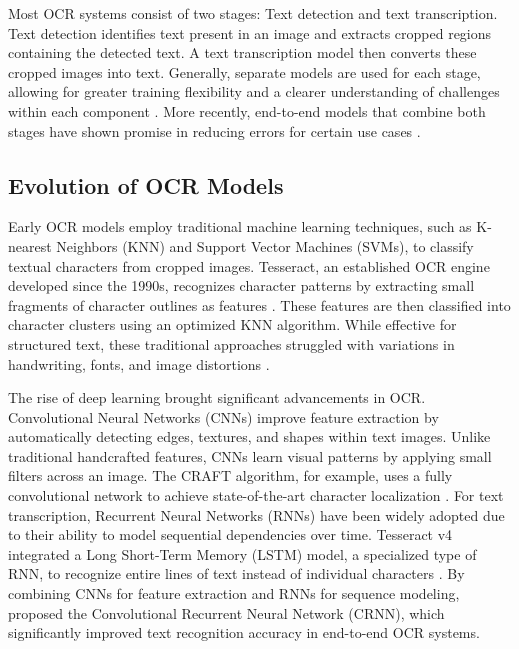 \documentclass[12pt,oneside]{memoir}
\begin{document}
Most OCR systems consist of two stages: Text detection and text transcription.
Text detection identifies text present in an image and extracts cropped regions containing the detected text. 
A text transcription model then converts these cropped images into text.
Generally, separate models are used for each stage, allowing for greater training flexibility and a clearer understanding of challenges within each component \parencite{subramani-etal-2023}. 
More recently, end-to-end models that combine both stages have shown promise in reducing errors for certain use cases \parencite{feng-etal-2019}.

\subsection{Evolution of OCR Models}

Early OCR models employ traditional machine learning techniques, such as K-nearest Neighbors (KNN) and Support Vector Machines (SVMs), to classify textual characters from cropped images.
Tesseract, an established OCR engine developed since the 1990s, recognizes character patterns by extracting small fragments of character outlines as features \parencite{smith-2013}.
These features are then classified into character clusters using an optimized KNN algorithm.
While effective for structured text, these traditional approaches struggled with variations in handwriting, fonts, and image distortions \parencite{subramani-etal-2023}.

The rise of deep learning brought significant advancements in OCR.
Convolutional Neural Networks (CNNs) improve feature extraction by automatically detecting edges, textures, and shapes within text images.
Unlike traditional handcrafted features, CNNs learn visual patterns by applying small filters across an image. 
The CRAFT algorithm, for example, uses a fully convolutional network to achieve state-of-the-art character localization \parencite{baek-etal-2019}.
For text transcription, Recurrent Neural Networks (RNNs) have been widely adopted due to their ability to model sequential dependencies over time.
Tesseract v4 integrated a Long Short-Term Memory (LSTM) model, a specialized type of RNN, to recognize entire lines of text instead of individual characters \parencite{tesseract-2025}.
By combining CNNs for feature extraction and RNNs for sequence modeling, \textcite{shi-etal-2015} proposed the Convolutional Recurrent Neural Network (CRNN), which significantly improved text recognition accuracy in end-to-end OCR systems.
\end{document}

